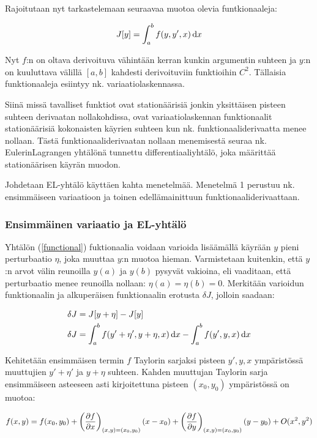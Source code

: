\documentclass[../johdoksia.tex]{subfiles}
\begin{document}
	Rajoitutaan nyt tarkastelemaan seuraavaa muotoa olevia funtkionaaleja:
	
	\begin{equation}
		\label{functional}
		J[y] = \int_{a}^{b}f(y, y', x)\odif{x}
	\end{equation}

	Nyt $f$:n on oltava derivoituva vähintään kerran kunkin argumentin suhteen ja $y$:n on kuuluttava välillä $[a, b]$ kahdesti derivoituviin funktioihin $C^2$. Tällaisia funktionaaleja esiintyy nk. variaatiolaskennassa.
	
	Siinä missä tavalliset funktiot ovat stationäärisiä jonkin yksittäisen pisteen suhteen derivaatan nollakohdissa, ovat variaatiolaskennan funktionaalit stationäärisiä kokonaisten käyrien suhteen kun nk. funktionaaliderivaatta menee nollaan. Tästä funktionaaliderivaatan nollaan menemisestä seuraa nk. Eulerin\textendash Lagrangen yhtälönä tunnettu differentiaaliyhtälö, joka määrittää stationäärisen käyrän muodon.
	
	Johdetaan EL-yhtälö käyttäen kahta menetelmää. Menetelmä 1 perustuu nk. ensimmäiseen variaatioon ja toinen edellämainittuun funktionaaliderivaattaan. 
	
	\subsubsection{Ensimmäinen variaatio ja EL-yhtälö}
	
	Yhtälön (\ref{functional}) fuktionaalia voidaan varioida lisäämällä käyrään $y$ pieni perturbaatio $\eta$, joka muuttaa $y$:n muotoa hieman. Varmistetaan kuitenkin, että $y$:n arvot välin reunoilla $y(a)$ ja $y(b)$ pysyvät vakioina, eli vaaditaan, että perturbaatio menee reunoilla nollaan: $\eta(a) = \eta(b) = 0$. Merkitään varioidun funktionaalin ja alkuperäisen funktionaalin erotusta $\delta J$, jolloin saadaan:
	
	\begin{align*}
		\delta J &= J[y + \eta] - J[y] \\
		\delta J &= \int_{a}^{b}f(y' + \eta', y + \eta, x)\odif{x} - \int_{a}^{b}f(y', y, x)\odif{x}
	\end{align*}

	Kehitetään ensimmäisen termin $f$ Taylorin sarjaksi pisteen $y', y, x$ ympäristössä muuttujien $y' + \eta'$ ja $y + \eta$ suhteen. Kahden muuttujan Taylorin sarja ensimmäiseen asteeseen asti kirjoitettuna pisteen $(x_0, y_0)$ ympäristössä on muotoa:
	
	\begin{equation}
		f(x,y) = f(x_0, y_0) + \left(\pdv{f}{x}\right)_{(x,y) = (x_0,y_0)}(x - x_0) + \left(\pdv{f}{y}\right)_{(x,y) = (x_0,y_0)}(y - y_0) + O(x^2,y^2) 
	\end{equation}
	
\end{document}

